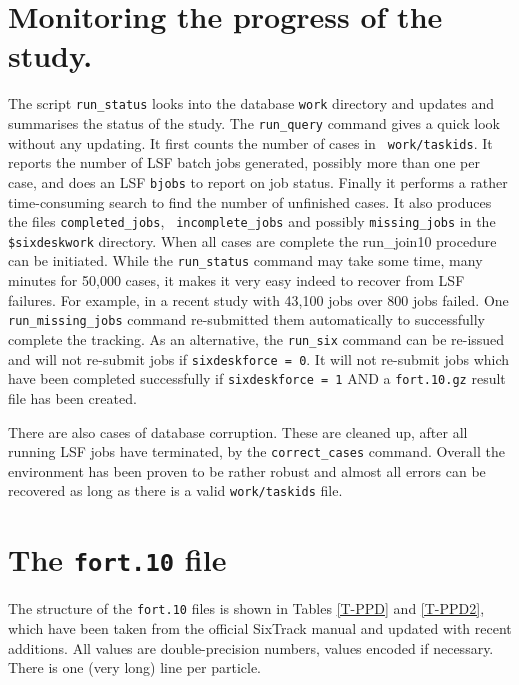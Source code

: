 \documentclass{cernatsnote}
\begin{document}
\section{Monitoring the progress of the study.} \label{sec:status} The script
\texttt{run\_status} looks into the database \texttt{work} directory and updates and
summarises the status of the study. The \texttt{run\_query} command gives a quick
look without any updating. It first counts the number of cases in {\tt
work/taskids}.  It reports the number of LSF batch jobs generated, possibly
more than one per case, and does an LSF \texttt{bjobs} to report on job status.
Finally it performs a rather time-consuming search to find the number of
unfinished cases.  It also produces the files \texttt{completed\_jobs}, {\tt
incomplete\_jobs} and possibly \texttt{missing\_jobs} in the \texttt{\$sixdeskwork}
directory.  When all cases are complete the {run\_join10} procedure can be
initiated. While the \texttt{run\_status} command may take some time, many minutes
for 50,000 cases, it makes it very easy indeed to recover from LSF failures.
For example, in a recent study with 43,100 jobs over 800 jobs failed. One {\tt
run\_missing\_jobs} command re-submitted them automatically to successfully
complete the tracking.  As an alternative, the \texttt{run\_six} command can be
re-issued and will not re-submit jobs if \texttt{sixdeskforce = 0}. It will not
re-submit jobs which have been completed successfully if \texttt{sixdeskforce = 1}
AND a \texttt{fort.10.gz} result file has been created.

There are also cases of database corruption. These are cleaned up, after all
running LSF jobs have terminated, by the \texttt{correct\_cases} command. Overall
the environment has been proven to be rather robust and almost all errors can
be recovered as long as there is a valid \texttt{work/taskids} file.

\section{The \texttt{fort.10} file}
\label{sec:fort10}
The structure of the \texttt{fort.10} files is shown in Tables \ref{T-PPD} and
\ref{T-PPD2}, which have been taken from the official SixTrack manual
\cite{SixTrack} and updated with recent additions.  All values are
double-precision numbers, values encoded if necessary.  There is one (very
long) line per particle.

 \setcounter{dst}{0}
\end{document}
